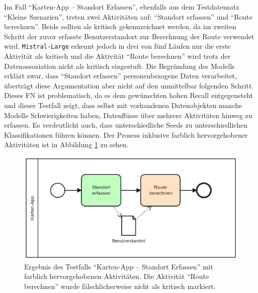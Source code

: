 Im Fall \enquote{Karten-App – Standort Erfassen}, ebenfalls aus dem Testdatensatz \enquote{Kleine Szenarien}, treten zwei Aktivitäten auf: \enquote{Standort erfassen} und \enquote{Route berechnen}. Beide sollten als kritisch gekennzeichnet werden, da im zweiten Schritt der zuvor erfasste Benutzerstandort zur Berechnung der Route verwendet wird. \texttt{Mistral-Large} erkennt jedoch in drei von fünf Läufen nur die erste Aktivität als kritisch und die Aktivität \enquote{Route berechnen} wird trotz der Datenassoziation nicht als kritisch eingestuft. Die Begründung des Modells erklärt zwar, dass \enquote{Standort erfassen} personenbezogene Daten verarbeitet, überträgt diese Argumentation aber nicht auf den unmittelbar folgenden Schritt. Dieses \ac{FN} ist problematisch, da es dem gewünschten hohen Recall entgegensteht und dieser Testfall zeigt, dass selbst mit vorhandenen Datenobjekten manche Modelle Schwierigkeiten haben, Datenflüsse über mehrere Aktivitäten hinweg zu erfassen. Es verdeutlicht auch, dass unterschiedliche Seeds zu unterschiedlichen Klassifikationen führen können. Der Prozess inklusive farblich hervorgehobener Aktivitäten ist in Abbildung \ref{fig:mistral-fall} zu sehen.

\begin{figure}
    \centering
    \includegraphics[width=.55\textwidth]{images/results/examples/mistral-large-run-3-small-maps-app}
    \caption{Ergebnis des Testfalls \enquote{Karten-App – Standort Erfassen} mit farblich hervorgehobenen Aktivitäten. Die Aktivität \enquote{Route berechnen} wurde fälschlicherweise nicht als kritisch markiert.}
    \label{fig:mistral-fall}
\end{figure}